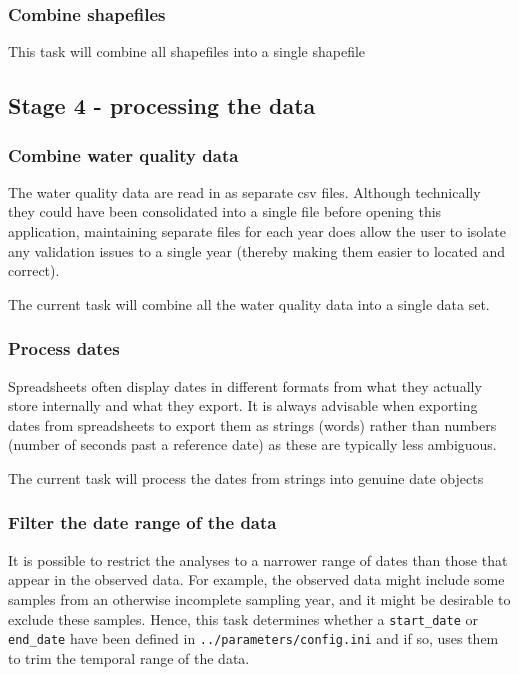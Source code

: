 \documentclass[
  8pt,
  a4paper]{article}
\begin{document}
\subsubsection{Combine shapefiles}\label{combine-shapefiles}

This task will combine all shapefiles into a single shapefile

\subsection{Stage 4 - processing the
data}\label{stage-4---processing-the-data}

\subsubsection{Combine water quality
data}\label{combine-water-quality-data}

The water quality data are read in as separate csv files. Although
technically they could have been consolidated into a single file before
opening this application, maintaining separate files for each year does
allow the user to isolate any validation issues to a single year
(thereby making them easier to located and correct).

The current task will combine all the water quality data into a single
data set.

\subsubsection{Process dates}\label{process-dates}

Spreadsheets often display dates in different formats from what they
actually store internally and what they export. It is always advisable
when exporting dates from spreadsheets to export them as strings (words)
rather than numbers (number of seconds past a reference date) as these
are typically less ambiguous.

The current task will process the dates from strings into genuine date
objects

\subsubsection{Filter the date range of the
data}\label{filter-the-date-range-of-the-data}

It is possible to restrict the analyses to a narrower range of dates
than those that appear in the observed data. For example, the observed
data might include some samples from an otherwise incomplete sampling
year, and it might be desirable to exclude these samples. Hence, this
task determines whether a \texttt{start\_date} or \texttt{end\_date}
have been defined in \texttt{../parameters/config.ini} and if so, uses
them to trim the temporal range of the data.
\end{document}
